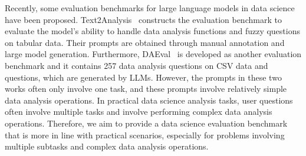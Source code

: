 Recently, some evaluation benchmarks for large language models in data science have been proposed. 
Text2Analysis~\citep{he2024text2analysis} constructs the evaluation benchmark to evaluate the model's ability to handle data analysis functions and fuzzy questions on tabular data. Their prompts are obtained through manual annotation and large model generation.
Furthermore, DAEval~\citep{huinfiagent} is developed as another evaluation benchmark and it contains 257 data analysis questions on CSV data and questions, which are generated by LLMs.
However, the prompts in these two works often only involve one task, and these prompts involve relatively simple data analysis operations.
In practical data science analysis tasks, user questions often involve multiple tasks and involve performing complex data analysis operations.
Therefore, we aim to provide a data science evaluation benchmark that is more in line with practical scenarios, especially for problems involving multiple subtasks and complex data analysis operations.